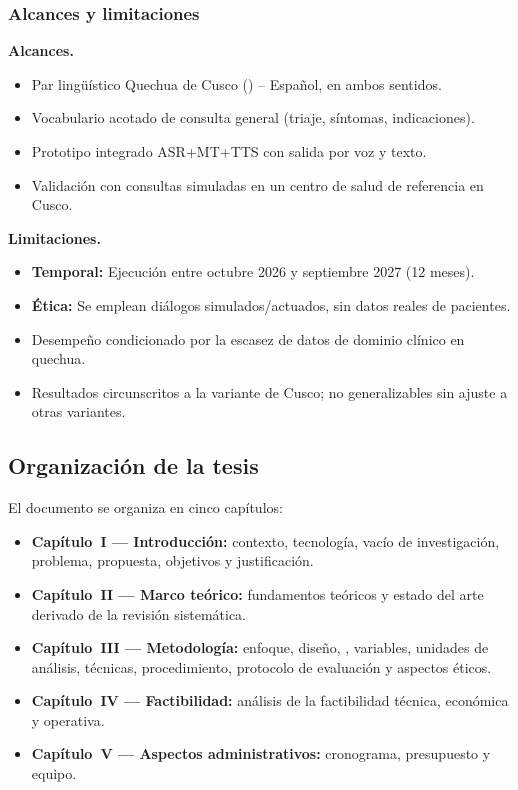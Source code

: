 \subsubsection{Alcances y limitaciones}
\noindent\textbf{Alcances.}
\begin{itemize}
  \item Par ling{\"u}{\'i}stico Quechua de Cusco () -- Espa{\~n}ol, en ambos sentidos.
  \item Vocabulario acotado de consulta general (triaje, s{\'i}ntomas, indicaciones).
  \item Prototipo integrado ASR+MT+TTS con salida por voz y texto.
  \item Validaci{\'o}n con consultas simuladas en un centro de salud de referencia en Cusco.
\end{itemize}
\noindent\textbf{Limitaciones.}
\begin{itemize}
  \item \textbf{Temporal:} Ejecuci{\'o}n entre octubre 2026 y septiembre 2027 (12 meses).
  \item \textbf{{\'E}tica:} Se emplean di{\'a}logos simulados/actuados, sin datos reales de pacientes.
  \item Desempe{\~n}o condicionado por la escasez de datos de dominio cl{\'i}nico en quechua.
  \item Resultados circunscritos a la variante de Cusco; no generalizables sin ajuste a otras variantes.
\end{itemize}

\subsection{Organizaci{\'o}n de la tesis}
El documento se organiza en cinco cap{\'i}tulos:
\begin{itemize}\setlength{\itemsep}{1pt}
  \item \textbf{Cap{\'i}tulo~I --- Introducci{\'o}n:} contexto, tecnolog{\'i}a, vac{\'i}o de
  investigaci{\'o}n, problema, propuesta, objetivos y justificaci{\'o}n.
  \item \textbf{Cap{\'i}tulo~II --- Marco te{\'o}rico:} fundamentos te{\'o}ricos y estado del arte
  derivado de la revisi{\'o}n sistem{\'a}tica.
  \item \textbf{Cap{\'i}tulo~III --- Metodolog{\'i}a:} enfoque, dise{\~n}o, ,
  variables, unidades de an{\'a}lisis, t{\'e}cnicas, procedimiento, protocolo de evaluaci{\'o}n y
  aspectos {\'e}ticos.
  \item \textbf{Cap{\'i}tulo~IV --- Factibilidad:} an{\'a}lisis de la factibilidad t{\'e}cnica,
  econ{\'o}mica y operativa.
  \item \textbf{Cap{\'i}tulo~V --- Aspectos administrativos:} cronograma, presupuesto y equipo.
\end{itemize}
